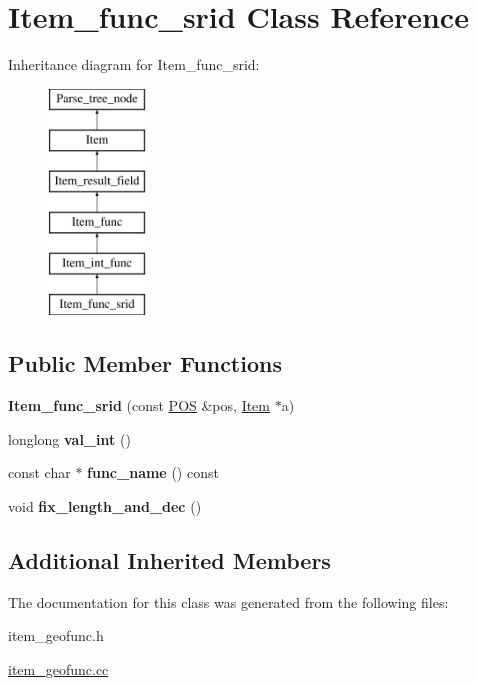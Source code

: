 \hypertarget{classItem__func__srid}{}\section{Item\+\_\+func\+\_\+srid Class Reference}
\label{classItem__func__srid}
Inheritance diagram for Item\+\_\+func\+\_\+srid\+:\begin{figure}[H]
\begin{center}
\leavevmode
\includegraphics[height=6.000000cm]{classItem__func__srid}
\end{center}
\end{figure}
\subsection*{Public Member Functions}
\begin{DoxyCompactItemize}
\item 
\mbox{\label{classItem__func__srid_a7b657d2cacf20a89322acbda6e783e21}} 
{\bfseries Item\+\_\+func\+\_\+srid} (const \mbox{\hyperlink{structYYLTYPE}{P\+OS}} \&pos, \mbox{\hyperlink{classItem}{Item}} $\ast$a)
\item 
\mbox{\label{classItem__func__srid_a9aef4af2df3d589f88c6fa502d7b06c6}} 
longlong {\bfseries val\+\_\+int} ()
\item 
\mbox{\label{classItem__func__srid_a5aa2f02c80f2f2bf172a903b4e4cdad0}} 
const char $\ast$ {\bfseries func\+\_\+name} () const
\item 
\mbox{\label{classItem__func__srid_a62bb5ea28329fe61cf2a18fb80c9054a}} 
void {\bfseries fix\+\_\+length\+\_\+and\+\_\+dec} ()
\end{DoxyCompactItemize}
\subsection*{Additional Inherited Members}


The documentation for this class was generated from the following files\+:\begin{DoxyCompactItemize}
\item 
item\+\_\+geofunc.\+h\item 
\mbox{\hyperlink{item__geofunc_8cc}{item\+\_\+geofunc.\+cc}}\end{DoxyCompactItemize}
